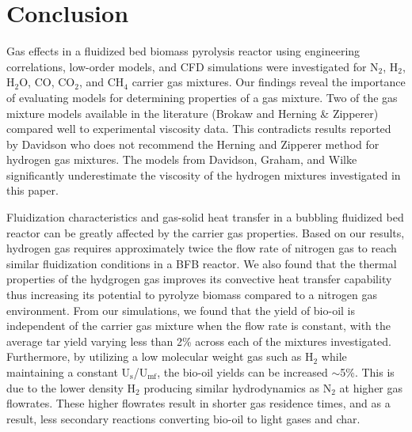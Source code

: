 
\section{Conclusion}

Gas effects in a fluidized bed biomass pyrolysis reactor using engineering correlations, low-order models, and CFD simulations were investigated for N$_2$, H$_2$, H$_2$O, CO, CO$_2$, and CH$_4$ carrier gas mixtures. Our findings reveal the importance of evaluating models for determining properties of a gas mixture. Two of the gas mixture models available in the literature (Brokaw and Herning \& Zipperer) compared well to experimental viscosity data. This contradicts results reported by Davidson who does not recommend the Herning and Zipperer method for hydrogen gas mixtures. The models from Davidson, Graham, and Wilke significantly underestimate the viscosity of the hydrogen mixtures investigated in this paper.

Fluidization characteristics and gas-solid heat transfer in a bubbling fluidized bed reactor can be greatly affected by the carrier gas properties. Based on our results, hydrogen gas requires approximately twice the flow rate of nitrogen gas to reach similar fluidization conditions in a BFB reactor. We also found that the thermal properties of the hydgrogen gas improves its convective heat transfer capability thus increasing its potential to pyrolyze biomass compared to a nitrogen gas environment. From our simulations, we found that the yield of bio-oil is independent of the carrier gas mixture when the flow rate is constant, with the average tar yield varying less than 2\% across each of the mixtures investigated. Furthermore, by utilizing a low molecular weight gas such as H$_2$ while maintaining a constant U$_\text{s}$/U$_\text{mf}$, the bio-oil yields can be increased $\sim$5\%. This is due to the lower density H$_2$ producing similar hydrodynamics as N$_2$ at higher gas flowrates. These higher flowrates result in shorter gas residence times, and as a result, less secondary reactions converting bio-oil to light gases and char.
